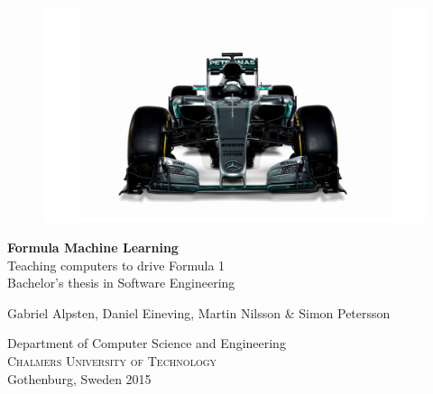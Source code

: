 \begin{titlepage}
			
\addtolength{\voffset}{2cm}

\begin{figure}[H]
\centering
\vspace{1cm}	%
\includegraphics[width=0.9\linewidth]{report/images/logo.jpg}
\end{figure}

\mbox{}
\vfill
\renewcommand{\familydefault}{\sfdefault} \normalfont %
\textbf{{\Huge 	Formula Machine Learning}} 	\\[0.5cm]
{\Large Teaching computers to drive Formula 1}\\[0.5cm]
Bachelor's thesis in Software Engineering \setlength{\parskip}{1cm}

{\large Gabriel Alpsten, Daniel Eineving, Martin Nilsson \& Simon Petersson} \setlength{\parskip}{2.9cm}

Department of Computer Science and Engineering \\
\textsc{Chalmers University of Technology} \\
Gothenburg, Sweden 2015

\renewcommand{\familydefault}{\rmdefault} \normalfont %
\end{titlepage}


\newpage
\restoregeometry
\thispagestyle{empty}
\mbox{}


